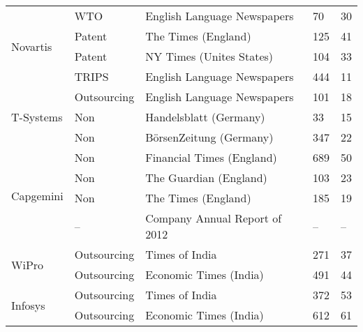 \begin{table}[htdp!]
\begin{tabular}{llp{6cm}ll}
\multirow{4}{*}{Novartis} &WTO        &English Language Newspapers&70&30\\
                          &Patent     &The Times (England)         & 125       &41  \\
                          &Patent     &NY Times (Unites States)     &104&33\\
                          &TRIPS       &English Language Newspapers&444&11\bigskip\\
\multirow{3}{*}{T-Systems}      &Outsourcing&English Language Newspapers&101  &18\\
                                &Non &Handelsblatt (Germany)      & 33  &15\\
                                &Non&B\"{o}rsenZeitung (Germany)   & 347 &22\bigskip\\
                       
\multirow{4}{*}{Capgemini}    &Non&Financial Times (England)                & 689& 50\\
                              &Non&The Guardian (England)                 &103& 23\\
                              &Non&The Times (England)                    &185& 19\\
                              &--&Company Annual Report of 2012    &-- &--\bigskip\\
\multirow{2}{*}{WiPro}        &Outsourcing&Times of India        &271    &37\\
                              &Outsourcing&Economic Times (India)        &491    &44\bigskip\\
\multirow{2}{*}{Infosys}      &Outsourcing&Times of India        &372    &53\\
                              &Outsourcing&Economic Times (India)       &612    &61\\	\bottomrule
\end{tabular}
\end{table}

